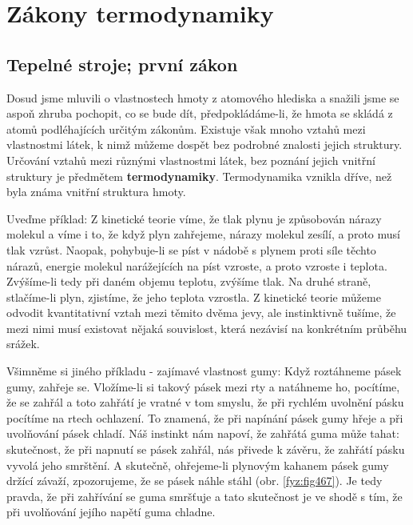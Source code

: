 \setchaptertoc
\chapter{Zákony termodynamiky}\label{fyz:IchapXLIV}

  \section{Tepelné stroje; první zákon}\label{fyz:IchapXLIVsecI}
    Dosud jsme mluvili o vlastnostech hmoty z atomového hlediska a snažili jsme se aspoň zhruba
    pochopit, co se bude dít, předpokládáme-li, že hmota se skládá z atomů podléhajících určitým
    zákonům. Existuje však mnoho vztahů mezi vlastnostmi látek, k nimž můžeme dospět bez podrobné
    znalosti jejich struktury. Určování vztahů mezi různými vlastnostmi látek, bez poznání jejich
    vnitřní struktury je předmětem \textbf{termodynamiky}. Termodynamika vznikla dříve, než byla
    známa vnitřní struktura hmoty.
    
    Uveďme příklad: Z kinetické teorie víme, že tlak plynu je způsobován nárazy molekul a víme i to,
    že když plyn zahřejeme, nárazy molekul zesílí, a proto musí tlak vzrůst. Naopak, pohybuje-li se
    píst v nádobě s plynem proti síle těchto nárazů, energie molekul narážejících na píst vzroste, a
    proto vzroste i teplota. Zvýšíme-li tedy při daném objemu teplotu, zvýšíme tlak. Na druhé
    straně, stlačíme-li plyn, zjistíme, že jeho teplota vzrostla. Z kinetické teorie můžeme odvodit
    kvantitativní vztah mezi těmito dvěma jevy, ale instinktivně tušíme, že mezi nimi musí existovat
    nějaká souvislost, která nezávisí na konkrétním průběhu srážek. 
    
    Všimněme si jiného příkladu - zajímavé vlastnost gumy: Když roztáhneme pásek gumy, zahřeje se.
    Vložíme-li si takový pásek mezi rty a natáhneme ho, pocítíme, že se zahřál a toto zahřátí je
    vratné v tom smyslu, že při rychlém uvolnění pásku pocítíme na rtech ochlazení. To znamená, že
    při napínání pásek gumy hřeje a při uvolňování pásek chladí. Náš instinkt nám napoví, že zahřátá
    guma může tahat: skutečnost, že při napnutí se pásek zahřál, nás přivede k závěru, že zahřátí
    pásku vyvolá jeho smrštění. A skutečně, ohřejeme-li plynovým kahanem pásek gumy držící závaží,
    zpozorujeme, že se pásek náhle stáhl (obr. \ref{fyz:fig467}). Je tedy pravda, že při zahřívání
    se guma smršťuje a tato skutečnost je ve shodě s tím, že při uvolňování jejího napětí guma
    chladne.

